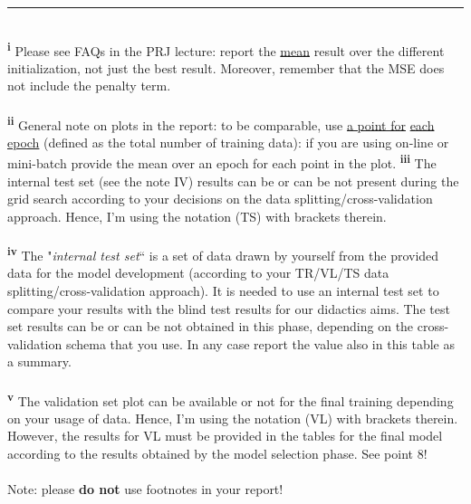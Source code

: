 \documentclass[11pt, letterpaper]{article}  %
\begin{document}
\noindent\rule{6cm}{0.4pt} \\
\noindent \textsuperscript{\textbf{i}} Please see FAQs in the PRJ lecture: report the \underline{mean} result over the different initialization, not just the best result. Moreover, remember that the  MSE does not  include the penalty term. \\ \\
\textsuperscript{\textbf{ii}} General note on plots in the report: to be comparable,  use  \underline{a point for} \underline{each epoch} (defined as the total number of training data): if you are using on-line or mini-batch provide the mean over an epoch for each point in the plot.
\textsuperscript{\textbf{iii}}  The internal test set (see the note IV) results can be or can be not present during the grid search according to your decisions on the  data splitting/cross-validation approach. Hence, I’m using the notation (TS) with brackets therein. \\ \\ 
\textsuperscript{\textbf{iv}} The "\textit{internal test set}`` is a set of data drawn by yourself from the provided data for the model development  (according to your  TR/VL/TS data splitting/cross-validation approach). It is needed to use an internal test set to compare your results with the blind test results for our didactics aims. The test set results can be or can be not obtained in this phase, depending on the  cross-validation schema that you use. In any case report the value also in this table as a summary. \\ \\ 
\textsuperscript{\textbf{v}} The validation set  plot can be available or not for the final training depending on your usage of data. Hence, I’m using the notation (VL) with brackets therein. However, the results for VL must be provided in the tables for the final model according to the results obtained by the model selection phase. See point 8!   \\ \\

\noindent Note: please \textbf{do not} use footnotes in your report!
\end{document}

